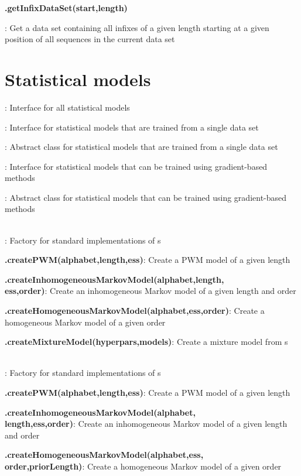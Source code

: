 \documentclass[10pt]{scrartcl}
\newcommand{\entry}[3]{{\item[]\bfseries #1#2}: #3}
\newcommand{\entrys}[3]{\item[\emph{static}] {\bfseries {#1#2}}: #3}
\newcommand{\sep}{\\~\vspace{-0.1cm}}
\begin{document}
\begin{flushleft}
\begin{itemize*}
\entry{\DataSet}{.getInfixDataSet(start,length)}{Get a data set containing all infixes of a given length starting at a given position of all sequences in the current data set}
\end{itemize*}

\section{Statistical models}

\begin{itemize*}

\entry{\StatMod}{}{Interface for all statistical models}

\entry{\TrainSM}{}{Interface for statistical models that are trained from a single data set}

\entry{\AbstractTrainSM}{}{Abstract class for statistical models that are trained from a single data set}

\entry{\DiffSM}{}{Interface for statistical models that can be trained using gradient-based methods}

\entry{\AbstractDiffSM}{}{Abstract class for statistical models that can be trained using gradient-based methods}\sep

\entry{\TrainSMFactory}{}{Factory for standard implementations of \TrainSM s}

\entrys{\TrainSMFactory}{.createPWM(alphabet,length,ess)}{Create a PWM model of a given length}

\entrys{\TrainSMFactory}{.createInhomogeneousMarkovModel(alphabet,length,\\ess,order)}{Create an inhomogeneous Markov model of a given length and order}

\entrys{\TrainSMFactory}{.createHomogeneousMarkovModel(alphabet,ess,order)}{Create a homogeneous Markov model of a given order}

\entrys{\TrainSMFactory}{.createMixtureModel(hyperpars,models)}{Create a mixture model from \TrainSM s}\sep

\entry{\DiffSMFactory}{}{Factory for standard implementations of \DiffSM s}

\entrys{\DiffSMFactory}{.createPWM(alphabet,length,ess)}{Create a PWM model of a given length}

\entrys{\DiffSMFactory}{.createInhomogeneousMarkovModel(alphabet,\\length,ess,order)}{Create an inhomogeneous Markov model of a given length and order}

\entrys{\DiffSMFactory}{.createHomogeneousMarkovModel(alphabet,ess,\\order,priorLength)}{Create a homogeneous Markov model of a given order}


\end{itemize*}
\end{flushleft}
\end{document}
